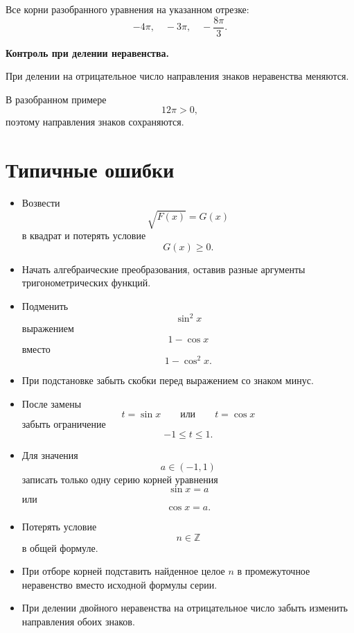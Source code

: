\documentclass[a4paper,12pt]{article}
\newcommand{\Z}{\mathbb{Z}}
\begin{document}
Все корни разобранного уравнения на указанном отрезке:
\[
\boxed{
-4\pi,
\quad
-3\pi,
\quad
-\frac{8\pi}{3}.
}
\]

\begin{noteBox}
\textbf{Контроль при делении неравенства.}

При делении на отрицательное число направления знаков неравенства меняются.

В разобранном примере
\[
12\pi>0,
\]
поэтому направления знаков сохраняются.
\end{noteBox}

\section{Типичные ошибки}

\begin{itemize}

  \item
  Возвести
  \[
  \sqrt{F(x)}=G(x)
  \]
  в квадрат и потерять условие
  \[
  G(x)\ge0.
  \]

  \item
  Начать алгебраические преобразования, оставив разные аргументы тригонометрических функций.

  \item
  Подменить
  \[
  \sin^2x
  \]
  выражением
  \[
  1-\cos x
  \]
  вместо
  \[
  1-\cos^2x.
  \]

  \item
  При подстановке забыть скобки перед выражением со знаком минус.

  \item
  После замены
  \[
  t=\sin x
  \qquad\text{или}\qquad
  t=\cos x
  \]
  забыть ограничение
  \[
  -1\le t\le1.
  \]

  \item
  Для значения
  \[
  a\in(-1,1)
  \]
  записать только одну серию корней уравнения
  \[
  \sin x=a
  \]
  или
  \[
  \cos x=a.
  \]

  \item
  Потерять условие
  \[
  n\in\Z
  \]
  в общей формуле.

  \item
  При отборе корней подставить найденное целое \(n\) в промежуточное неравенство вместо исходной формулы серии.

  \item
  При делении двойного неравенства на отрицательное число забыть изменить направления обоих знаков.

\end{itemize}
\end{document}
